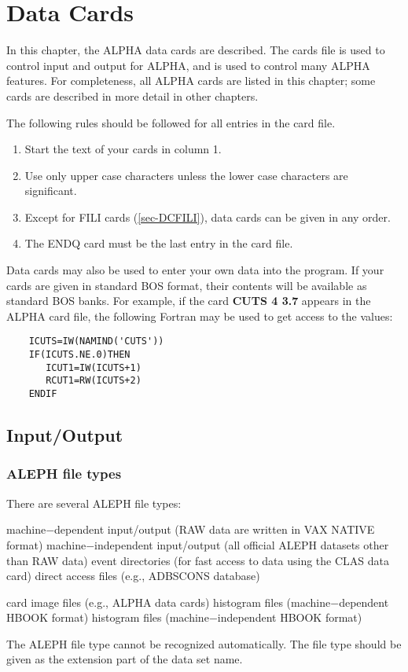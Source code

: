 \chapter{\label{sec-DC}Data Cards}
\par
\par In this chapter, the ALPHA data cards are described.
The cards file is used to control input and output for ALPHA, and
is
used to control many ALPHA features.
For completeness, all
ALPHA cards are listed in this chapter; some cards are described in
more detail
in other chapters.
 
 
The following rules should be followed for all entries in the card
file.
\begin{enumerate}
\item Start the text of your cards in column 1.
\item Use only upper case characters unless the lower case characters
are significant.
\item Except for FILI cards (\ref{sec-DCFILI}),
data cards can be given in any order.
\item The ENDQ card must be the last entry in the card file.
\end{enumerate}
 
Data cards may also be used to enter your
own data into the program. If your cards are given in standard BOS
format, their
contents will be available as standard BOS
banks. For example, if the card {\bf CUTS 4 3.7}
appears in the ALPHA card file, the following Fortran may be used to
get access to the values:
\begin{verbatim}
    ICUTS=IW(NAMIND('CUTS'))
    IF(ICUTS.NE.0)THEN
       ICUT1=IW(ICUTS+1)
       RCUT1=RW(ICUTS+2)
    ENDIF
\end{verbatim}
 
\section{\label{sec-DCIO}Input/Output}
\par
\subsection{\label{sec-DCFT}ALEPH file types}
\par
\par There are several ALEPH file types:
\begin{indentlist}{ 2.50cm}{ 2.75cm}
machine$-$dependent input/output (RAW data are written in VAX NATIVE format)
machine$-$independent input/output (all official ALEPH datasets other than RAW data)
event directories (for fast access to data using the CLAS data card)
direct access files (e.g., ADBSCONS database)
 
card image files (e.g., ALPHA data cards)
histogram files (machine$-$dependent HBOOK format)
histogram files (machine$-$independent HBOOK format)
\end{indentlist}
\par The ALEPH file type cannot be recognized automatically. The file type
should be given as the extension part of the data set name.
 
